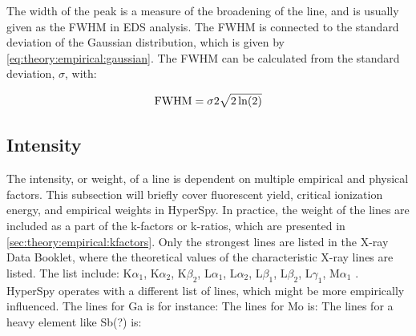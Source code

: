 The width of the peak is a measure of the broadening of the line, and is usually given as the FWHM in EDS analysis. The FWHM is connected to the standard deviation of the Gaussian distribution, which is given by \cref{eq:theory:empirical:gaussian}.
The FWHM can be calculated from the standard deviation, $\sigma$, with:

\begin{equation}
    \label{eq:theory:empirical:peaks:FWHM}
    \textnormal{FWHM} = {\sigma}{2\sqrt{2\ln(2)}}
\end{equation}


%
% 
\subsection{Intensity}
\label{sec:theory:empirical:intensity}



The intensity, or weight, of a line is dependent on multiple empirical and physical factors.
This subsection will briefly cover fluorescent yield, critical ionization energy, and empirical weights in HyperSpy.
In practice, the weight of the lines are included as a part of the k-factors or k-ratios, which are presented in \cref{sec:theory:empirical:kfactors}.
Only the strongest lines are listed in the X-ray Data Booklet, where the theoretical values of the characteristic X-ray lines are listed.
The list include: K$\alpha_1$, K$\alpha_2$, K$\beta_2$, L$\alpha_1$, L$\alpha_2$, L$\beta_1$, L$\beta_2$, L$\gamma_1$, M$\alpha_1$ \cite{thompson_x-ray_2004}.
HyperSpy operates with a different list of lines, which might be more empirically influenced.
The lines for Ga is for instance:
The lines for Mo is:
The lines for a heavy element like Sb(?) is:



